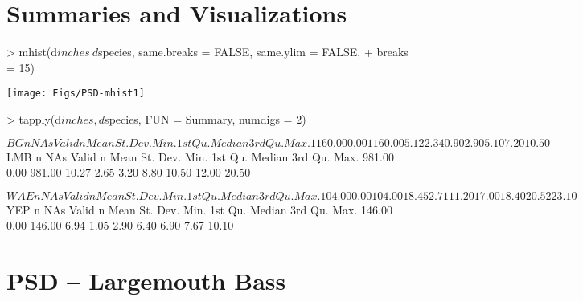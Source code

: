 \documentclass[a4paper]{article}
\begin{document}
\section{Summaries and Visualizations}
\begin{Schunk}
\begin{Sinput}
> mhist(d$inches ~ d$species, same.breaks = FALSE, same.ylim = FALSE,
+     breaks = 15)
\end{Sinput}
\end{Schunk}
\texttt{[image: Figs/PSD-mhist1]}

\begin{Schunk}
\begin{Sinput}
> tapply(d$inches, d$species, FUN = Summary, numdigs = 2)
\end{Sinput}
\begin{Soutput}
$BG
       n      NAs  Valid n     Mean St. Dev.     Min.  1st Qu.   Median  3rd Qu.     Max.
 1160.00     0.00  1160.00     5.12     2.34     0.90     2.90     5.10     7.20    10.50

$LMB
       n      NAs  Valid n     Mean St. Dev.     Min.  1st Qu.   Median  3rd Qu.     Max.
  981.00     0.00   981.00    10.27     2.65     3.20     8.80    10.50    12.00    20.50

$WAE
       n      NAs  Valid n     Mean St. Dev.     Min.  1st Qu.   Median  3rd Qu.     Max.
  104.00     0.00   104.00    18.45     2.71    11.20    17.00    18.40    20.52    23.10

$YEP
       n      NAs  Valid n     Mean St. Dev.     Min.  1st Qu.   Median  3rd Qu.     Max.
  146.00     0.00   146.00     6.94     1.05     2.90     6.40     6.90     7.67    10.10
\end{Soutput}
\end{Schunk}

\section{PSD -- Largemouth Bass}
\end{document}
